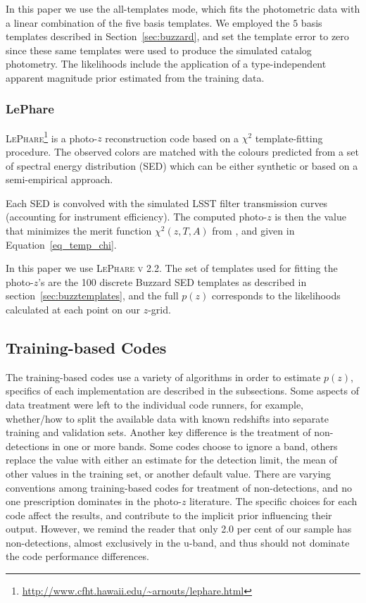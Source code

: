In this paper we use the all-templates mode, which fits the photometric data with a linear combination of the five basis templates. We employed the $5$ basis templates described in Section~\ref{sec:buzzard}, and set the template error to zero since these same templates were used to produce the simulated catalog photometry. %
The likelihoods include the application of a type-independent apparent magnitude prior estimated from the training data.

\subsubsection{LePhare}\label{sec:lephare}

\textsc{LePhare}\footnote{\url{http://www.cfht.hawaii.edu/~arnouts/lephare.html}}\citep[Photometric Analysis for Redshift Estimate,][]{Arnouts:99,Ilbert:06} is a photo-$z$ reconstruction code based on a $\chi^2$ template-fitting procedure. The observed colors are matched with the colours predicted from a set of spectral energy distribution (SED) which can be either synthetic or based on a semi-empirical approach. %

Each SED is convolved with the simulated LSST filter transmission curves (accounting for instrument efficiency).  The computed photo-$z$ is then the value that minimizes the merit function $\chi^2 (z,T,A)$ from \citet[]{Arnouts:99}, and given in Equation~\ref{eq_temp_chi}.

In this paper we use \textsc{LePhare v 2.2}.
The set of templates used for fitting the photo-$z$'s are the 100 discrete Buzzard SED templates as described in section~\ref{sec:buzztemplates}, and the full $p(z)$ corresponds to the likelihoods calculated at each point on our $z$-grid.


\subsection{Training-based Codes}
\label{sec:trainingcodes}
The training-based codes use a variety of algorithms in order to estimate $p(z)$, specifics of each implementation are described in the subsections.  Some aspects of data treatment were left to the individual code runners, for example, whether/how to split the available data with known redshifts into separate training and validation sets.  Another key difference is the treatment of non-detections in one or more bands.  Some codes choose to ignore a band, others replace the value with either an estimate for the detection limit, the mean of other values in the training set, or another default value.  There are varying conventions among training-based codes for treatment of non-detections, and no one prescription dominates in the photo-$z$ literature.  The specific choices for each code affect the results, and contribute to the implicit prior influencing their output.  However, we remind the reader that only 2.0 per cent of our sample has non-detections, almost exclusively in the u-band, and thus should not dominate the code performance differences.

